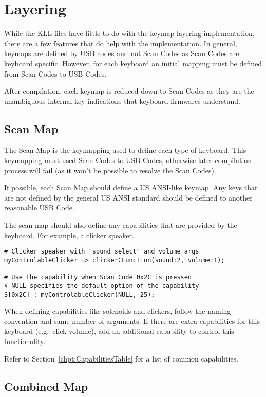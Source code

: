 \documentclass{kiibohd-template}
\begin{document}
\chapter{Layering}

While the KLL files have little to do with the keymap layering implementation, there are a few features that do help with the implementation.
In general, keymaps are defined by USB codes and not Scan Codes as Scan Codes are keyboard specific.
However, for each keyboard an initial mapping must be defined from Scan Codes to USB Codes.

After compilation, each keymap is reduced down to Scan Codes as they are the unambiguous internal key indications that keyboard firmwares understand.


\section{Scan Map}

The Scan Map is the keymapping used to define each type of keyboard.
This keymapping must used Scan Codes to USB Codes, otherwise later compilation process will fail (as it won't be possible to resolve the Scan Codes).

If possible, each Scan Map should define a US ANSI-like keymap.
Any keys that are not defined by the general US ANSI standard should be defined to another reasonable USB Code.

The scan map should also define any capabilities that are provided by the keyboard.
For example, a clicker speaker.

\begin{lstlisting}
# Clicker speaker with "sound select" and volume args
myControlableClicker => clickerCFunction(sound:2, volume:1);

# Use the capability when Scan Code 0x2C is pressed
# NULL specifies the default option of the capability
S[0x2C] : myControlableClicker(NULL, 25);
\end{lstlisting}

When defining capabilities like solenoids and clickers, follow the naming convention and same number of arguments.
If there are extra capabilities for this keyboard (e.g.\ click volume), add an additional capability to control this functionality.

Refer to Section~\ref{chpt:CapabilitiesTable} for a list of common capabilities.


\section{Combined Map}
\end{document}
